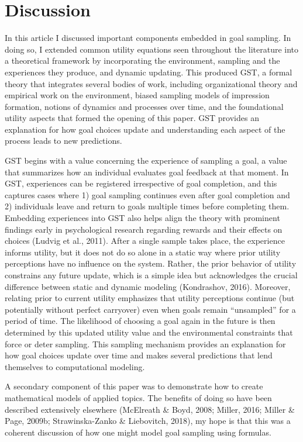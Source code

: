 \documentclass[english,,man]{apa6}
\theoremstyle{definition}
\theoremstyle{definition}
\theoremstyle{definition}
\theoremstyle{remark}
\begin{document}
\hypertarget{discussion}{%
\section{Discussion}\label{discussion}}

In this article I discussed important components embedded in goal
sampling. In doing so, I extended common utility equations seen
throughout the literature into a theoretical framework by incorporating
the environment, sampling and the experiences they produce, and dynamic
updating. This produced GST, a formal theory that integrates several
bodies of work, including organizational theory and empirical work on
the environment, biased sampling models of impression formation, notions
of dynamics and processes over time, and the foundational utility
aspects that formed the opening of this paper. GST provides an
explanation for how goal choices update and understanding each aspect of
the process leads to new predictions.

GST begins with a value concerning the experience of sampling a goal, a
value that summarizes how an individual evaluates goal feedback at that
moment. In GST, experiences can be registered irrespective of goal
completion, and this captures cases where 1) goal sampling continues
even after goal completion and 2) individuals leave and return to goals
multiple times before completing them. Embedding experiences into GST
also helps align the theory with prominent findings early in
psychological research regarding rewards and their effects on choices
(Ludvig et al., 2011). After a single sample takes place, the experience
informs utility, but it does not do so alone in a static way where prior
utility perceptions have no influence on the system. Rather, the prior
behavior of utility constrains any future update, which is a simple idea
but acknowledges the crucial difference between static and dynamic
modeling (Kondrashov, 2016). Moreover, relating prior to current utility
emphasizes that utility perceptions continue (but potentially without
perfect carryover) even when goals remain \enquote{unsampled} for a
period of time. The likelihood of choosing a goal again in the future is
then determined by this updated utility value and the environmental
constraints that force or deter sampling. This sampling mechanism
provides an explanation for how goal choices update over time and makes
several predictions that lend themselves to computational modeling.

A secondary component of this paper was to demonstrate how to create
mathematical models of applied topics. The benefits of doing so have
been described extensively elsewhere (McElreath \& Boyd, 2008; Miller,
2016; Miller \& Page, 2009b; Strawinska-Zanko \& Liebovitch, 2018), my
hope is that this was a coherent discussion of how one might model goal
sampling using formulas.
\end{document}
